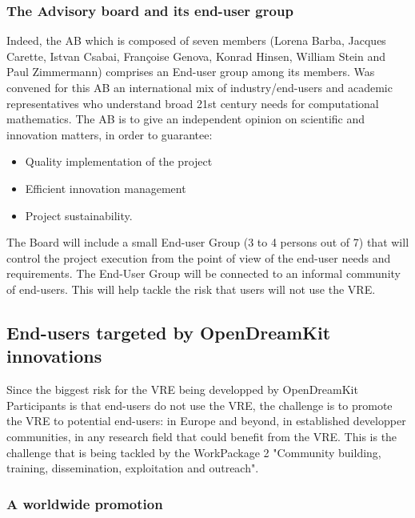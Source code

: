 \documentclass{deliverablereport}
\begin{document}
\subsubsection{The Advisory board and its end-user group}

Indeed, the AB which is composed of seven members (Lorena Barba, Jacques Carette, Istvan Csabai, Françoise Genova, Konrad Hinsen, William Stein and Paul Zimmermann) comprises an End-user group among its members. Was convened for this AB an international mix of industry/end-users and academic representatives who understand broad 21st century needs for computational mathematics.
The AB is to give an independent opinion on scientific and innovation matters, in order to guarantee:

\begin{itemize}
\item{Quality implementation of the project}
\item{Efficient innovation management}
\item{Project sustainability.}
\end{itemize}

The Board will include a small End-user Group (3 to 4 persons out of 7) that will control the project execution from the point of view of the end-user needs and requirements. The End-User Group will be connected to an informal community of end-users. This will help tackle the risk that users will not use the VRE.

\subsection{End-users targeted by OpenDreamKit innovations}

Since the biggest risk for the VRE being developped by OpenDreamKit Participants is that end-users do not use the VRE, the challenge is to promote the VRE to potential end-users: in Europe and beyond, in established developper communities, in any research field that could benefit from the VRE. This is the challenge that is being tackled by the WorkPackage 2 "Community building, training, dissemination, exploitation and outreach".


\subsubsection{A worldwide promotion}
\end{document}
